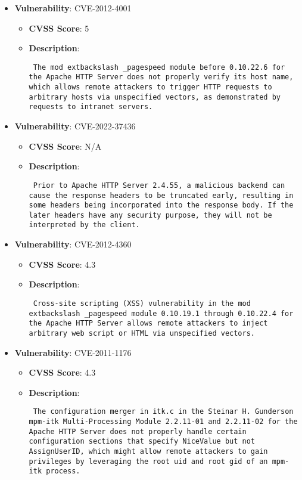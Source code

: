 \documentclass{article}
\begin{document}
\begin{itemize}
        \item \textbf{Vulnerability}: CVE-2012-4001
        \begin{itemize}
            \item \textbf{CVSS Score}:  5 
            \item \textbf{Description}: \parbox{\linewidth}{\texttt{ The mod	extbackslash _pagespeed module before 0.10.22.6 for the Apache HTTP Server does not properly verify its host name, which allows remote attackers to trigger HTTP requests to arbitrary hosts via unspecified vectors, as demonstrated by requests to intranet servers. }}
        \end{itemize}
    
        \item \textbf{Vulnerability}: CVE-2022-37436
        \begin{itemize}
            \item \textbf{CVSS Score}:  N/A 
            \item \textbf{Description}: \parbox{\linewidth}{\texttt{ Prior to Apache HTTP Server 2.4.55, a malicious backend can cause the response headers to be truncated early, resulting in some headers being incorporated into the response body. If the later headers have any security purpose, they will not be interpreted by the client. }}
        \end{itemize}
    
        \item \textbf{Vulnerability}: CVE-2012-4360
        \begin{itemize}
            \item \textbf{CVSS Score}:  4.3 
            \item \textbf{Description}: \parbox{\linewidth}{\texttt{ Cross-site scripting (XSS) vulnerability in the mod	extbackslash _pagespeed module 0.10.19.1 through 0.10.22.4 for the Apache HTTP Server allows remote attackers to inject arbitrary web script or HTML via unspecified vectors. }}
        \end{itemize}
    
        \item \textbf{Vulnerability}: CVE-2011-1176
        \begin{itemize}
            \item \textbf{CVSS Score}:  4.3 
            \item \textbf{Description}: \parbox{\linewidth}{\texttt{ The configuration merger in itk.c in the Steinar H. Gunderson mpm-itk Multi-Processing Module 2.2.11-01 and 2.2.11-02 for the Apache HTTP Server does not properly handle certain configuration sections that specify NiceValue but not AssignUserID, which might allow remote attackers to gain privileges by leveraging the root uid and root gid of an mpm-itk process. }}
        \end{itemize}
    

\end{itemize}
\end{document}
